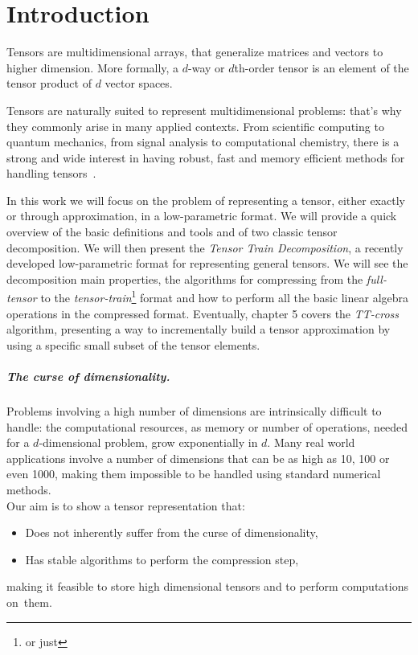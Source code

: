 \chapter{Introduction}
Tensors are multidimensional arrays, that generalize matrices and vectors to higher dimension. More formally, a $d$-way or $d$th-order tensor is an element of the tensor product of $d$ vector spaces.

Tensors are naturally suited to represent multidimensional problems: that's why they commonly arise in many applied contexts. From scientific computing to quantum mechanics, from signal analysis to computational chemistry, there is a strong and wide interest in having robust, fast and memory efficient methods for handling tensors~\cite{tensorreview}.%

In this work we will focus on the problem of representing a tensor, either exactly or through approximation, in a low-parametric format.
We will provide a quick overview of the basic definitions and tools and of two classic tensor decomposition. We will then present the \emph{Tensor Train Decomposition}, a recently developed low-parametric format for representing general tensors. We will see the decomposition main properties, the algorithms for compressing from the \emph{full-tensor} to the \emph{tensor-train}\footnote{or just } format and how to perform all the basic linear algebra operations in the compressed format. Eventually, chapter 5 covers the \emph{TT-cross} algorithm, presenting a way to incrementally build a tensor approximation by using a specific small subset of the tensor elements.

\paragraph{The curse of dimensionality.}
Problems involving a high number of dimensions are intrinsically difficult to handle: the computational resources, as memory or number of operations, needed for a $d$-dimensional problem, grow exponentially in $d$. Many real world applications involve a number of dimensions that can be as high as 10, 100 or even 1000, making them impossible to be handled using standard numerical methods.\\
Our aim is to show a tensor representation that:
\begin{itemize}
\item Does not inherently suffer from the curse of dimensionality,
\item Has stable algorithms to perform the compression step,
\end{itemize}
making it feasible to store high dimensional tensors and to perform computations on~them.
